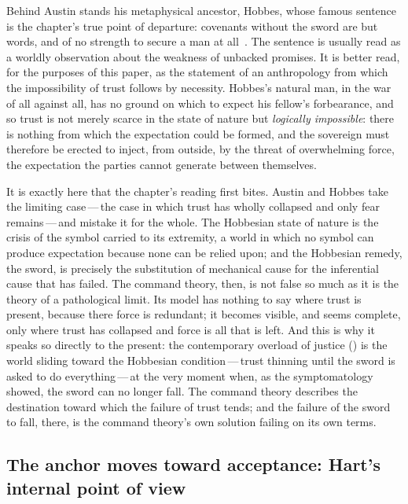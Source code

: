 Behind Austin stands his metaphysical ancestor, Hobbes, whose famous sentence is the chapter's true point of departure: covenants without the sword are but words, and of no strength to secure a man at all~\parencite{hobbes1651}. The sentence is usually read as a worldly observation about the weakness of unbacked promises. It is better read, for the purposes of this paper, as the statement of an anthropology from which the impossibility of trust follows by necessity. Hobbes's natural man, in the war of all against all, has no ground on which to expect his fellow's forbearance, and so trust is not merely scarce in the state of nature but \emph{logically impossible}: there is nothing from which the expectation could be formed, and the sovereign must therefore be erected to inject, from outside, by the threat of overwhelming force, the expectation the parties cannot generate between themselves.

It is exactly here that the chapter's reading first bites. Austin and Hobbes take the limiting case\,---\,the case in which trust has wholly collapsed and only fear remains\,---\,and mistake it for the whole. The Hobbesian state of nature is the crisis of the symbol carried to its extremity, a world in which no symbol can produce expectation because none can be relied upon; and the Hobbesian remedy, the sword, is precisely the substitution of mechanical cause for the inferential cause that has failed. The command theory, then, is not false so much as it is the theory of a pathological limit. Its model has nothing to say where trust is present, because there force is redundant; it becomes visible, and seems complete, only where trust has collapsed and force is all that is left. And this is why it speaks so directly to the present: the contemporary overload of justice () is the world sliding toward the Hobbesian condition\,---\,trust thinning until the sword is asked to do everything\,---\,at the very moment when, as the symptomatology showed, the sword can no longer fall. The command theory describes the destination toward which the failure of trust tends; and the failure of the sword to fall, there, is the command theory's own solution failing on its own terms.

\subsection{The anchor moves toward acceptance: Hart's internal point of view}
\label{p13:sub:jur-hart}

